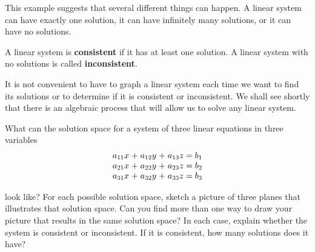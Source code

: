 This example suggests that several different things can happen. A linear system can have exactly one solution, it can have infinitely many solutions, or it can have no solutions.

\begin{definition}
	A linear system is \textbf{consistent} if it has at least one solution. A linear system with no solutions is called \textbf{inconsistent}.
\end{definition}

It is not convenient to have to graph a linear system each time we want to find its solutions or to determine if it is consistent or inconsistent. We shall see shortly that there is an algebraic process that will allow us to solve any linear system.

\begin{exercise}
	What can the solution space for a system of three linear equations in three variables
	\[
	\arraycolsep=1.4pt
	\begin{array}{rcrcrl}
		a_{11}x &+& a_{12}y &+& a_{13}z &= b_1\\
		a_{21}x &+& a_{22}y &+& a_{23}z &= b_2\\
		a_{31}x &+& a_{32}y &+& a_{33}z &= b_3		
	\end{array}
	\]
	
	\noindent look like? For each possible solution space, sketch a picture of three planes that illustrates that solution space. Can you find more than one way to draw your picture that results in the same solution space? In each case, explain whether the system is consistent or inconsistent. If it is consistent, how many solutions does it have?
\end{exercise}

\vfill











